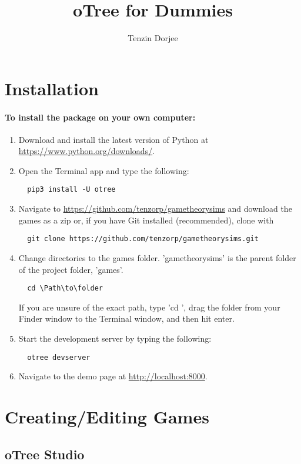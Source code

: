 \documentclass{article}
\title{oTree for Dummies}
\author{Tenzin Dorjee}
\begin{document}
	\maketitle
	\newpage
	\tableofcontents
	\newpage
	
	\section{Installation}
		\paragraph{To install the package on your own computer:}
			\begin{enumerate}
				\item Download and install the latest version of Python at \url{https://www.python.org/downloads/}.
				\item Open the Terminal app and type the following:
					\begin{lstlisting}
  pip3 install -U otree
					\end{lstlisting}
				\item Navigate to \url{https://github.com/tenzorp/gametheorysims} and download the games as a zip or, if you have Git installed (recommended), clone with 
					\begin{lstlisting}
  git clone https://github.com/tenzorp/gametheorysims.git
					\end{lstlisting}
				\item Change directories to the games folder. 'gametheorysims' is the parent folder of the project folder, 'games'.
					\begin{lstlisting}
  cd \Path\to\folder
					\end{lstlisting}
					If you are unsure of the exact path, type 'cd ', drag the folder from your Finder window to the Terminal window, and then hit enter.
				\item Start the development server by typing the following:
				\begin{lstlisting}
  otree devserver
				\end{lstlisting}
				\item Navigate to the demo page at \url{http://localhost:8000}.
  			\end{enumerate}
	\section{Creating/Editing Games}
		\subsection{oTree Studio}
\end{document}

